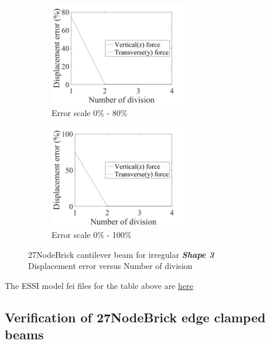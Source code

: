 \documentclass[fleqn,11pt,letter]{article}
\begin{document}
\begin{figure}[H]
  \begin{subfigure}{0.5\textwidth}
    \centering
    \includegraphics[width=6cm]{../Figure_files/27NodeBrick/error27brick_beam_irregular_shape3.jpeg}
    \caption{Error scale 0\% - 80\%}
  \end{subfigure}
  \begin{subfigure}{0.5\textwidth}
    \centering
    \includegraphics[width=6cm]{../Figure_files/27NodeBrick/error27brick_beam_irregular_shape3100.jpeg}
    \caption{Error scale 0\% - 100\%}
  \end{subfigure}
  \captionsetup{justification=centering,margin=3cm}
  \caption{27NodeBrick cantilever beam for irregular \textbf{\emph{Shape 3}}\\
      Displacement error   versus   Number of division}
  \label{fig shape 3 27NodeBrick cantilever beam for irregular more elements}
\end{figure}



The ESSI model fei files for the table above are \href{https://github.com/yuan-energy/ESSI_Verification/blob/master/27NodeBrick/cantilever_irregular_element_cut/cantilever_irregular_element_cut.tar.gz?raw=true}{here}












\newpage
\subsection{Verification of 27NodeBrick edge clamped beams }
\end{document}
